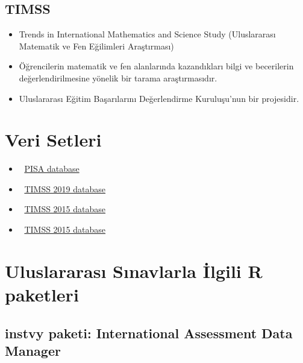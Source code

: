\documentclass[
  oneside]{book}
\begin{document}
\hypertarget{timss}{%
\subsection{TIMSS}\label{timss}}

\begin{itemize}
\item
  Trends in International Mathematics and Science Study (Uluslararası Matematik ve Fen Eğilimleri Araştırması)
\item
  Öğrencilerin matematik ve fen alanlarında kazandıkları bilgi ve becerilerin değerlendirilmesine yönelik bir tarama araştırmasıdır.
\item
  Uluslararası Eğitim Başarılarını Değerlendirme Kuruluşu'nun bir projesidir.
\end{itemize}

\hypertarget{veri-setleri-1}{%
\section{Veri Setleri}\label{veri-setleri-1}}

\begin{itemize}
\item
  🔗 \href{https://www.oecd.org/pisa/data/}{PISA database}
\item
  🔗 \href{https://timss2019.org/international-database/}{TIMSS 2019 database}
\item
  🔗 \href{https://timssandpirls.bc.edu/timss2015/international-database/}{TIMSS 2015 database}
\item
  🔗 \href{https://timssandpirls.bc.edu/timss2011/international-database.html}{TIMSS 2015 database}
\end{itemize}

\hypertarget{uluslararasux131-sux131navlarla-ilgili-r-paketleri}{%
\section{Uluslararası Sınavlarla İlgili R paketleri}\label{uluslararasux131-sux131navlarla-ilgili-r-paketleri}}

\hypertarget{instvy-paketi-international-assessment-data-manager}{%
\subsection{\texorpdfstring{\textbf{instvy} paketi: International Assessment Data Manager}{instvy paketi: International Assessment Data Manager}}\label{instvy-paketi-international-assessment-data-manager}}
\end{document}
